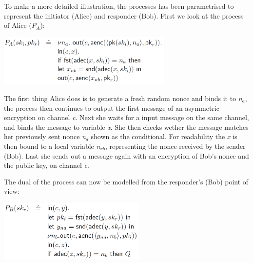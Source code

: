 \noindent To make a more detailed illustration, the processes has been parametrised to represent the initiator (Alice) and responder (Bob). First we look at the process of Alice (\textit{P$_A$}):
\begin{center}
\includegraphics[width=0.65\textwidth, angle=0]{Graphics/P_A.pdf}
\end{center}
The first thing Alice does is to generate a fresh random nonce and binds it to \textit{n$_a$}, the process then continues to output the first message of an asymmetric encryption on channel \textit{c}. Next she waits for a input message on the same channel, and binds the message to variable \textit{x}. She then checks wether the message matches her previously sent nonce \textit{n$_a$} shown as the conditional. For readability the \textit{x} is then bound to a local variable \textit{n$_{xb}$}, representing the nonce received by the sender (Bob). Last she sends out a message again with an encryption of Bob's nonce and the public key, on channel \textit{c}.

The dual of the process can now be modelled from the responder's (Bob) point of view:
\begin{center}
\includegraphics[width=0.55\textwidth, angle=0]{Graphics/P_B.pdf}
\end{center}

